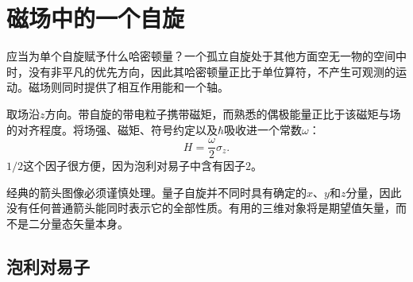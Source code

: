 \begin{classroomqa}
\end{classroomqa}

\section{磁场中的一个自旋}

应当为单个自旋赋予什么哈密顿量？一个孤立自旋处于其他方面空无一物的空间中时，没有非平凡的优先方向，因此其哈密顿量正比于单位算符，不产生可观测的运动。磁场则同时提供了相互作用能和一个轴。

取场沿\(z\)方向。带自旋的带电粒子携带磁矩，而熟悉的偶极能量正比于该磁矩与场的对齐程度。将场强、磁矩、符号约定以及\(\hbar\)吸收进一个常数\(\omega\)：
\begin{equation}
H=\frac{\omega}{2}\sigma_z.
\label{eq:l5-z-hamiltonian}
\end{equation}
\(1/2\)这个因子很方便，因为泡利对易子中含有因子\(2\)。

经典的箭头图像必须谨慎处理。量子自旋并不同时具有确定的\(x\)、\(y\)和\(z\)分量，因此没有任何普通箭头能同时表示它的全部性质。有用的三维对象将是期望值矢量，而不是二分量态矢量本身。

\subsection{泡利对易子}

